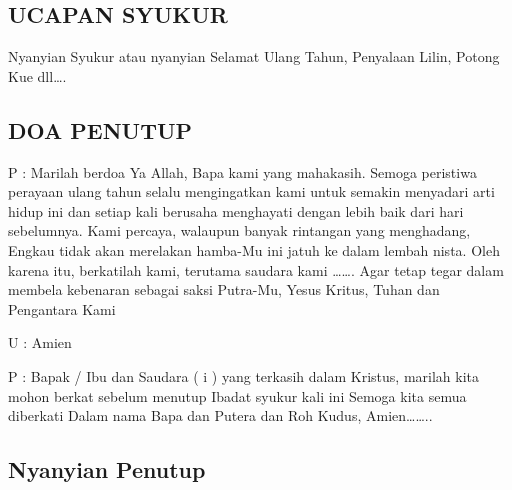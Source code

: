 \documentclass{article}
\begin{document}
\subsection{UCAPAN SYUKUR}
  Nyanyian Syukur atau nyanyian Selamat Ulang Tahun, Penyalaan Lilin, Potong Kue dll{\dots}.  

\subsection{DOA PENUTUP}
  P : Marilah berdoa Ya Allah, Bapa kami yang mahakasih. Semoga peristiwa perayaan ulang tahun selalu mengingatkan kami
untuk semakin menyadari arti hidup ini dan setiap kali berusaha menghayati dengan lebih baik dari hari sebelumnya. Kami
percaya, walaupun banyak rintangan yang menghadang, Engkau tidak akan merelakan hamba-Mu ini jatuh ke dalam lembah
nista. Oleh karena itu, berkatilah kami, terutama saudara kami {\dots}{\dots}. Agar tetap tegar dalam membela kebenaran
sebagai saksi Putra-Mu, Yesus Kritus, Tuhan dan Pengantara Kami  

U : Amien  

P : Bapak / Ibu dan Saudara ( i ) yang terkasih dalam Kristus, marilah kita mohon berkat sebelum menutup Ibadat syukur
kali ini  Semoga kita semua diberkati {\dag} Dalam nama Bapa dan Putera dan Roh Kudus, Amien{\dots}{\dots}..   

\subsection{Nyanyian Penutup }
\end{document}
